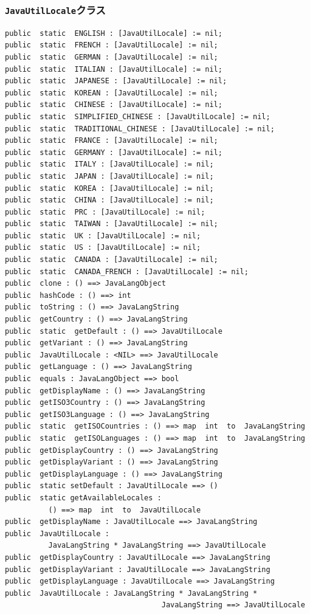 \documentclass[\pformat,12pt]{jarticle}
\begin{document}
\subsubsection{\texttt{JavaUtilLocale}クラス}
\begin{small}
\begin{verbatim}
public  static  ENGLISH : [JavaUtilLocale] := nil;
public  static  FRENCH : [JavaUtilLocale] := nil;
public  static  GERMAN : [JavaUtilLocale] := nil;
public  static  ITALIAN : [JavaUtilLocale] := nil;
public  static  JAPANESE : [JavaUtilLocale] := nil;
public  static  KOREAN : [JavaUtilLocale] := nil;
public  static  CHINESE : [JavaUtilLocale] := nil;
public  static  SIMPLIFIED_CHINESE : [JavaUtilLocale] := nil;
public  static  TRADITIONAL_CHINESE : [JavaUtilLocale] := nil;
public  static  FRANCE : [JavaUtilLocale] := nil;
public  static  GERMANY : [JavaUtilLocale] := nil;
public  static  ITALY : [JavaUtilLocale] := nil;
public  static  JAPAN : [JavaUtilLocale] := nil;
public  static  KOREA : [JavaUtilLocale] := nil;
public  static  CHINA : [JavaUtilLocale] := nil;
public  static  PRC : [JavaUtilLocale] := nil;
public  static  TAIWAN : [JavaUtilLocale] := nil;
public  static  UK : [JavaUtilLocale] := nil;
public  static  US : [JavaUtilLocale] := nil;
public  static  CANADA : [JavaUtilLocale] := nil;
public  static  CANADA_FRENCH : [JavaUtilLocale] := nil;
public  clone : () ==> JavaLangObject
public  hashCode : () ==> int
public  toString : () ==> JavaLangString
public  getCountry : () ==> JavaLangString
public  static  getDefault : () ==> JavaUtilLocale
public  getVariant : () ==> JavaLangString
public  JavaUtilLocale : <NIL> ==> JavaUtilLocale
public  getLanguage : () ==> JavaLangString
public  equals : JavaLangObject ==> bool
public  getDisplayName : () ==> JavaLangString
public  getISO3Country : () ==> JavaLangString
public  getISO3Language : () ==> JavaLangString
public  static  getISOCountries : () ==> map  int  to  JavaLangString
public  static  getISOLanguages : () ==> map  int  to  JavaLangString
public  getDisplayCountry : () ==> JavaLangString
public  getDisplayVariant : () ==> JavaLangString
public  getDisplayLanguage : () ==> JavaLangString
public  static setDefault : JavaUtilLocale ==> ()
public  static getAvailableLocales : 
          () ==> map  int  to  JavaUtilLocale
public  getDisplayName : JavaUtilLocale ==> JavaLangString
public  JavaUtilLocale : 
          JavaLangString * JavaLangString ==> JavaUtilLocale
public  getDisplayCountry : JavaUtilLocale ==> JavaLangString
public  getDisplayVariant : JavaUtilLocale ==> JavaLangString
public  getDisplayLanguage : JavaUtilLocale ==> JavaLangString
public  JavaUtilLocale : JavaLangString * JavaLangString * 
                                    JavaLangString ==> JavaUtilLocale
\end{verbatim}
\end{small}
\end{document}
